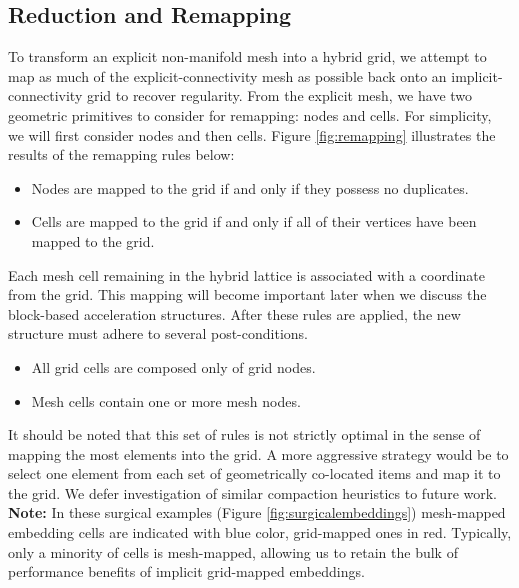 

\subsection{Reduction and Remapping}

To transform an explicit non-manifold mesh into a hybrid grid, we
attempt to map as much of the explicit-connectivity mesh as possible
back onto an implicit-connectivity grid to recover regularity. From
the explicit mesh, we have two geometric primitives to consider for
remapping: nodes and cells. For simplicity, we will first consider
nodes and then cells. Figure \ref{fig:remapping} illustrates the
results of the remapping rules below:
\begin{itemize}
\item Nodes are mapped to the grid if and only if they possess no duplicates.
\item Cells are mapped to the grid if and only if all of their vertices have been mapped to the grid.
\end{itemize}
 Each mesh cell remaining in the hybrid lattice is
associated with a coordinate from the grid. This mapping will become
important later when we discuss the block-based acceleration
structures.  After these rules are applied, the new structure must
adhere to several post-conditions.
\begin{itemize}
\item All grid cells are composed only of grid nodes.
\item Mesh cells contain one or more mesh nodes.
\end{itemize}
It should be noted that this set of rules is not strictly optimal in
the sense of mapping the most elements into the grid. A more
aggressive strategy would be to select one element from each set of
geometrically co-located items and map it to the grid. We defer
investigation of similar compaction heuristics to future work.
\textbf{Note:} In these surgical examples (Figure \ref{fig:surgicalembeddings}) mesh-mapped embedding cells are indicated
with blue color, grid-mapped ones in red. Typically, only a minority
of cells is mesh-mapped, allowing us to retain the bulk of performance
benefits of implicit grid-mapped embeddings.



